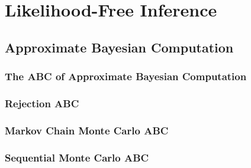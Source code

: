 \chapter{Likelihood-Free Inference}\label{chap:LFI}


\section{Approximate Bayesian Computation}\label{sec:abc}

\subsection{The ABC of Approximate Bayesian Computation}\label{sec:abc_of_abc}


\subsection{Rejection ABC}\label{sec:rejection_abc}


\subsection{Markov Chain Monte Carlo ABC}\label{sec:mcmc_abc}


\subsection{Sequential Monte Carlo ABC}\label{sec:smc_abc}
